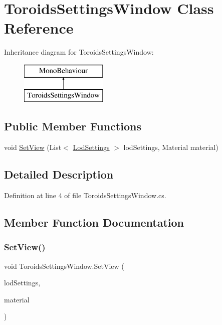 \hypertarget{class_toroids_settings_window}{}\section{Toroids\+Settings\+Window Class Reference}
\label{class_toroids_settings_window}
Inheritance diagram for Toroids\+Settings\+Window\+:\begin{figure}[H]
\begin{center}
\leavevmode
\includegraphics[height=2.000000cm]{class_toroids_settings_window}
\end{center}
\end{figure}
\subsection*{Public Member Functions}
\begin{DoxyCompactItemize}
\item 
void \mbox{\hyperlink{class_toroids_settings_window_a425a4f772ba43d04ff158f39d80be452}{Set\+View}} (List$<$ \mbox{\hyperlink{class_lod_settings}{Lod\+Settings}} $>$ lod\+Settings, Material material)
\end{DoxyCompactItemize}


\subsection{Detailed Description}


Definition at line 4 of file Toroids\+Settings\+Window.\+cs.



\subsection{Member Function Documentation}
\mbox{\label{class_toroids_settings_window_a425a4f772ba43d04ff158f39d80be452}} 
\subsubsection{\texorpdfstring{SetView()}{SetView()}}
{\footnotesize\ttfamily void Toroids\+Settings\+Window.\+Set\+View (\begin{DoxyParamCaption}\item[{List$<$ \mbox{\hyperlink{class_lod_settings}{Lod\+Settings}} $>$}]{lod\+Settings,  }\item[{Material}]{material }\end{DoxyParamCaption})}



